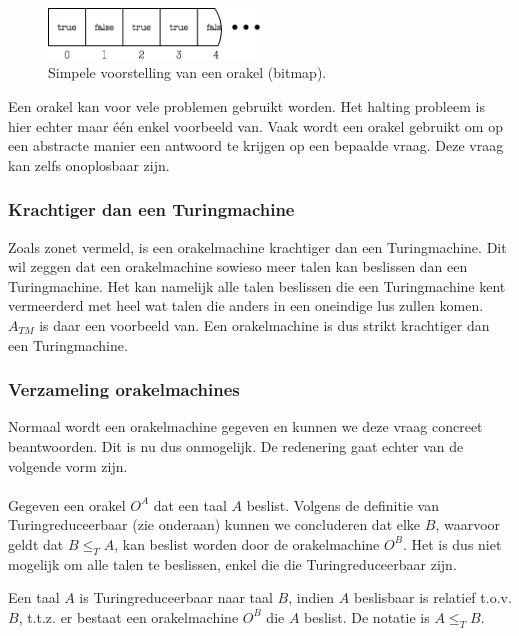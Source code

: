 \vspace{3mm}
\begin{figure}[h!]
  \centering
      \includegraphics[width=0.5\textwidth]{./img/oracle}
  \caption{Simpele voorstelling van een orakel (bitmap).}
\end{figure}
\vspace{3mm}

Een orakel kan voor vele problemen gebruikt worden. Het halting probleem is hier echter maar \'e\'en enkel voorbeeld van. Vaak wordt een orakel gebruikt om op een abstracte manier een antwoord te krijgen op een bepaalde vraag. Deze vraag kan zelfs onoplosbaar zijn.

\subsubsection*{Krachtiger dan een Turingmachine}

Zoals zonet vermeld, is een orakelmachine krachtiger dan een Turingmachine. Dit wil zeggen dat een orakelmachine sowieso meer talen kan beslissen dan een Turingmachine. Het kan namelijk alle talen beslissen die een Turingmachine kent vermeerderd met heel wat talen die anders in een oneindige lus zullen komen. $A_{TM}$ is daar een voorbeeld van. Een orakelmachine is dus strikt krachtiger dan een Turingmachine.

\subsubsection*{Verzameling orakelmachines}

Normaal wordt een orakelmachine gegeven en kunnen we deze vraag concreet beantwoorden. Dit is nu dus onmogelijk. De redenering gaat echter van de volgende vorm zijn.
\\\\
Gegeven een orakel $O^A$ dat een taal $A$ beslist. Volgens de definitie van Turingreduceerbaar (zie onderaan) kunnen we concluderen dat elke $B$, waarvoor geldt dat $B \leq_T A$, kan beslist worden door de orakelmachine $O^B$. Het is dus niet mogelijk om alle talen te beslissen, enkel die die Turingreduceerbaar zijn.

\begin{theorem}[Turingreduceerbaar]
	Een taal $A$ is Turingreduceerbaar naar taal $B$, indien $A$ beslisbaar is relatief t.o.v. $B$, t.t.z. er bestaat een orakelmachine $O^B$ die $A$ beslist. De notatie is $A \leq_T B$.
\end{theorem}

